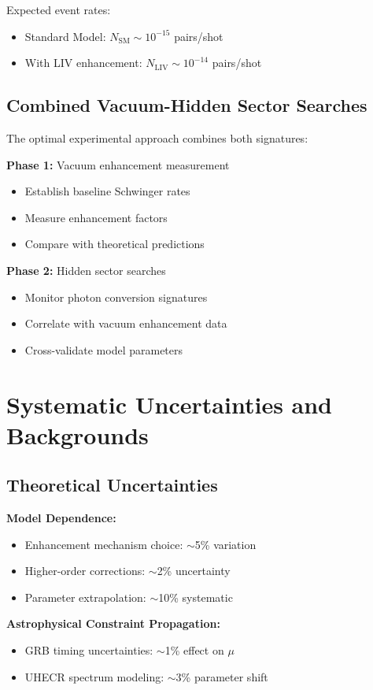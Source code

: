 \documentclass[12pt]{article}
\begin{document}
Expected event rates:
\begin{itemize}
\item Standard Model: $N_{\text{SM}} \sim 10^{-15}$ pairs/shot
\item With LIV enhancement: $N_{\text{LIV}} \sim 10^{-14}$ pairs/shot
\end{itemize}

\subsection{Combined Vacuum-Hidden Sector Searches}

The optimal experimental approach combines both signatures:

\textbf{Phase 1:} Vacuum enhancement measurement
\begin{itemize}
\item Establish baseline Schwinger rates
\item Measure enhancement factors
\item Compare with theoretical predictions
\end{itemize}

\textbf{Phase 2:} Hidden sector searches
\begin{itemize}
\item Monitor photon conversion signatures
\item Correlate with vacuum enhancement data
\item Cross-validate model parameters
\end{itemize}

\section{Systematic Uncertainties and Backgrounds}

\subsection{Theoretical Uncertainties}

\textbf{Model Dependence:}
\begin{itemize}
\item Enhancement mechanism choice: $\sim$5\% variation
\item Higher-order corrections: $\sim$2\% uncertainty
\item Parameter extrapolation: $\sim$10\% systematic
\end{itemize}

\textbf{Astrophysical Constraint Propagation:}
\begin{itemize}
\item GRB timing uncertainties: $\sim$1\% effect on $\mu$
\item UHECR spectrum modeling: $\sim$3\% parameter shift
\end{itemize}
\end{document}
